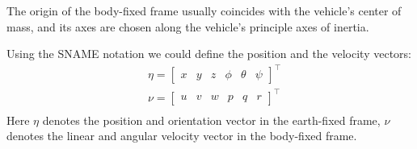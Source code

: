    The origin of the body-fixed frame usually coincides with the vehicle's center of mass,
     and its axes are chosen along the vehicle's principle axes of inertia.

    Using the SNAME notation we could define the position and the velocity vectors:    
    $$
    \begin{aligned}
    & \eta=\left[\begin{array}{llllll}
        x & y & z & \phi & \theta & \psi
        \end{array}\right]^{\top} \\
    & \nu=\left[\begin{array}{llllll}
    u & v & w & p & q & r
    \end{array}\right]^{\top} \\
    \end{aligned}
    $$
    Here $\eta$ denotes the position and orientation vector in the earth-fixed frame, 
    $\nu$ denotes the linear and angular velocity vector in the body-fixed frame.


